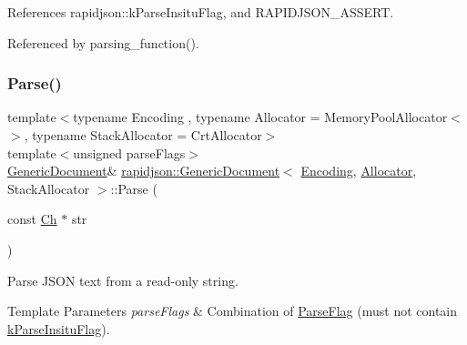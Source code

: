 References rapidjson\+::k\+Parse\+Insitu\+Flag, and R\+A\+P\+I\+D\+J\+S\+O\+N\+\_\+\+A\+S\+S\+E\+RT.



Referenced by parsing\+\_\+function().

\mbox{\label{classrapidjson_1_1_generic_document_a42c35e2f64c288f14b74fec2792500c8}} 
\subsubsection{\texorpdfstring{Parse()}{Parse()}\hspace{0.1cm}{\footnotesize\ttfamily [2/6]}}
{\footnotesize\ttfamily template$<$typename Encoding , typename Allocator  = Memory\+Pool\+Allocator$<$$>$, typename Stack\+Allocator  = Crt\+Allocator$>$ \\
template$<$unsigned parse\+Flags$>$ \\
\mbox{\hyperlink{classrapidjson_1_1_generic_document}{Generic\+Document}}\& \mbox{\hyperlink{classrapidjson_1_1_generic_document}{rapidjson\+::\+Generic\+Document}}$<$ \mbox{\hyperlink{classrapidjson_1_1_encoding}{Encoding}}, \mbox{\hyperlink{classrapidjson_1_1_allocator}{Allocator}}, Stack\+Allocator $>$\+::Parse (\begin{DoxyParamCaption}\item[{const \mbox{\hyperlink{classrapidjson_1_1_generic_value_adcdbc7fa85a9a41b78966d7e0dcc2ac4}{Ch}} $\ast$}]{str }\end{DoxyParamCaption})}



Parse J\+S\+ON text from a read-\/only string. 


\begin{DoxyTemplParams}{Template Parameters}
{\em parse\+Flags} & Combination of \mbox{\hyperlink{namespacerapidjson_a81379eb4e94a0386d71d15fda882ebc9}{Parse\+Flag}} (must not contain \mbox{\hyperlink{namespacerapidjson_a81379eb4e94a0386d71d15fda882ebc9a02748971d6ea0c5e22c69b8aa7f344ea}{k\+Parse\+Insitu\+Flag}}). \\
\hline
\end{DoxyTemplParams}

